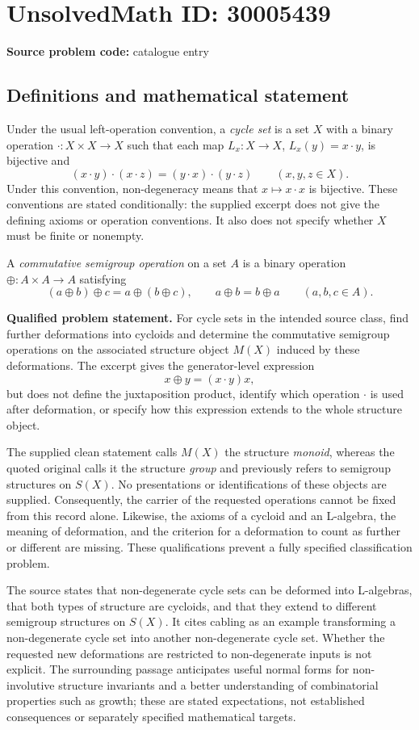 \documentclass[11pt]{article}
\begin{document}
\section*{UnsolvedMath ID: 30005439}
\textbf{Source problem code:} catalogue entry
\subsection{Definitions and mathematical statement}
Under the usual left-operation convention, a \emph{cycle set} is a set \(X\) with a binary operation \(\cdot:X\times X\to X\) such that each map \(L_x:X\to X\), \(L_x(y)=x\cdot y\), is bijective and
\[
(x\cdot y)\cdot(x\cdot z)=(y\cdot x)\cdot(y\cdot z)
\qquad(x,y,z\in X).
\]
Under this convention, non-degeneracy means that \(x\mapsto x\cdot x\) is bijective. These conventions are stated conditionally: the supplied excerpt does not give the defining axioms or operation conventions. It also does not specify whether \(X\) must be finite or nonempty.

A \emph{commutative semigroup operation} on a set \(A\) is a binary operation \(\oplus:A\times A\to A\) satisfying
\[
(a\oplus b)\oplus c=a\oplus(b\oplus c),
\qquad a\oplus b=b\oplus a
\qquad(a,b,c\in A).
\]

\textbf{Qualified problem statement.} For cycle sets in the intended source class, find further deformations into cycloids and determine the commutative semigroup operations on the associated structure object \(M(X)\) induced by these deformations. The excerpt gives the generator-level expression
\[
x\oplus y=(x\cdot y)x,
\]
but does not define the juxtaposition product, identify which operation \(\cdot\) is used after deformation, or specify how this expression extends to the whole structure object.

The supplied clean statement calls \(M(X)\) the structure \emph{monoid}, whereas the quoted original calls it the structure \emph{group} and previously refers to semigroup structures on \(S(X)\). No presentations or identifications of these objects are supplied. Consequently, the carrier of the requested operations cannot be fixed from this record alone. Likewise, the axioms of a cycloid and an L-algebra, the meaning of deformation, and the criterion for a deformation to count as further or different are missing. These qualifications prevent a fully specified classification problem.

The source states that non-degenerate cycle sets can be deformed into L-algebras, that both types of structure are cycloids, and that they extend to different semigroup structures on \(S(X)\). It cites cabling as an example transforming a non-degenerate cycle set into another non-degenerate cycle set. Whether the requested new deformations are restricted to non-degenerate inputs is not explicit. The surrounding passage anticipates useful normal forms for non-involutive structure invariants and a better understanding of combinatorial properties such as growth; these are stated expectations, not established consequences or separately specified mathematical targets.
\end{document}
